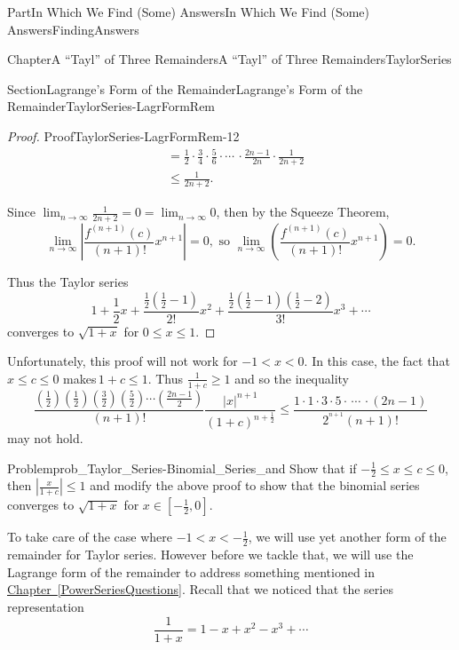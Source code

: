 \documentclass[oneside,10pt,]{book}
\newcommand{\xreffont}{\relax}
\numberwithin{equation}{part}
\newcommand{\abs}[1]{\left|#1\right|}
\def\limitt#1#2#3{{\displaystyle\lim_{#1\rightarrow #2}\textstyle #3}}
\newcommand{\lt}{<}
\newcommand{\amp}{&}
\begin{document}
\begin{partptx}{Part}{In Which We Find (Some) Answers}{}{In Which We Find (Some) Answers}{}{}{FindingAnswers}
\begin{chapterptx}{Chapter}{A ``Tayl'' of Three Remainders}{}{A ``Tayl'' of Three Remainders}{}{}{TaylorSeries}
\begin{sectionptx}{Section}{Lagrange's Form of the Remainder}{}{Lagrange's Form of the Remainder}{}{}{TaylorSeries-LagrFormRem}
\begin{proof}{Proof}{}{TaylorSeries-LagrFormRem-12}
\begin{align*}
\amp =\frac{1}{2}\cdot\frac{3}{4}\cdot\frac{5}{6}\cdot\cdots\,\cdot\frac{2n-1}{2n}\cdot\frac{1}{2n+2}\\
\amp \leq\frac{1}{2n+2}\text{.}
\end{align*}
%
\par
Since \(\limitt{n}{\infty}{\frac{1}{2n+2}}=0=\limitt{n}{\infty}{0}\), then by the Squeeze Theorem,%
\begin{equation*}
\lim_{n\rightarrow\infty}\abs{\frac{f^{(n+1)}(c)}{(n+1)!}x^{n+1}}=0, \text{ so } \lim_{n\rightarrow\infty}\left(\frac{f^{(n+1)}(c)}{(n+1)!}x^{n+1}\right)=0\text{.}
\end{equation*}
%
\par
Thus the Taylor series%
\begin{equation*}
1+\frac{1}{2}x+\frac{\frac{1}{2}\left(\frac{1}{2}-1\right)}{2!}x^2+\frac{\frac{1}{2}\left(\frac{1}{2}-1\right)\left(\frac{1}{2}-2\right)}{3!}x^3+\cdots
\end{equation*}
converges to \(\sqrt{1+x}\) for \(0\leq x\leq 1\).%
\end{proof}
Unfortunately, this proof will not work for \(-1\lt x\lt 0\). In this case, the fact that \(x\leq c\leq 0\) makes\(\,1+c\leq 1\). Thus \(\frac{1}{1+c}\geq 1\) and so the inequality%
\begin{equation*}
\frac{\left(\frac{1}{2}\right)\left(\frac{1}{2}\right)\left(\frac{3}{2}\right)\left(\frac{5}{2}\right)\cdots\left(\frac{2n-1}{2}\right)}{(n+1)!}\frac{|x|^{n+1}}{(1+c)^{n+\frac{1}{2}}}\leq\frac{1\cdot 1\cdot 3\cdot 5\cdot\,\cdots\,\cdot\left(2n-1\right)}{2^{^{n+1}}(n+1)!}
\end{equation*}
may not hold.%
\begin{problem}{Problem}{}{prob_Taylor_Series-Binomial_Series_and}%
 Show that if \(-\frac{1}{2}\leq x\leq c\leq 0\), then \(|\frac{x}{1+c}|\leq 1\) and modify the above proof to show that the binomial series converges to \(\sqrt{1+x}\) for \(x\in\left[-\frac{1}{2},0\right]\).%
\end{problem}
To take care of the case where \(-1\lt x\lt -\frac{1}{2}\), we will use yet another form of the remainder for Taylor series. However before we tackle that, we will use the Lagrange form of the remainder to address something mentioned in \hyperref[PowerSeriesQuestions]{Chapter~{\xreffont\ref{PowerSeriesQuestions}}}. Recall that we noticed that the series representation%
\begin{equation*}
\frac{1}{1+x}=1-x+x^2-x^3+\cdots
\end{equation*}

\end{sectionptx}
\end{chapterptx}
\end{partptx}
\end{document}
